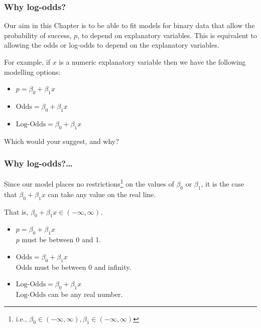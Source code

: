 \documentclass{beamer}\usepackage[]{graphicx}\usepackage[]{xcolor}
\begin{document}


\begin{frame}
\frametitle{Why log-odds?}
Our aim in this Chapter is to be able to fit models for binary data that allow the probability of success, $p$, to depend on explanatory variables. This is equivalent to allowing the odds or log-odds to depend on the explanatory variables.
\medskip

For example, if $x$ is a numeric explanatory variable then we have the following modelling options:
\medskip

\begin{itemize}
  \item $p = \beta_0 + \beta_1  x$
  \item $\text{Odds} = \beta_0 + \beta_1 x$
  \item $\text{Log-Odds} = \beta_0 + \beta_1 x$
\end{itemize}
\medskip

Which would your suggest, and why?

\end{frame}


\begin{frame}
\frametitle{Why log-odds?\ldots}
Since our model places no restrictions\footnote{i.e., $\beta_0 \in (-\infty,\infty), \beta_1 \in (-\infty,\infty)$} on the values of $\beta_0$ or $\beta_1$, it is the case that $\beta_0 + \beta_1 x$ can take any value on the real line. 
\medskip

That is, $\beta_0 + \beta_1 x \in (-\infty,\infty)$.

\bigskip

\begin{itemize}
  \item $p = \beta_0 + \beta_1 x$ \xmark \\
  $p$ must be between 0 and 1. \medskip
    
  \item $\text{Odds} = \beta_0 + \beta_1 x$ \xmark \\
  $\text{Odds}$ must be between 0 and infinity. \medskip
    
  \item $\text{Log-Odds} = \beta_0 + \beta_1 x$ \cmark \\
  $\text{Log-Odds}$ can be any real number.
\end{itemize}

\end{frame}
\end{document}
